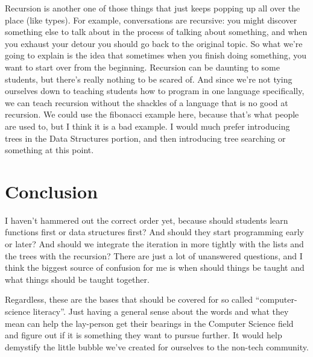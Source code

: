 \documentclass[12pt]{article}
\begin{document}
        Recursion is another one of those things that just keeps popping up all over the place (like types). For example, conversations are recursive: you might discover something else to talk about in the process of talking about something, and when you exhaust your detour you should go back to the original topic. So what we're going to explain is the idea that sometimes when you finish doing something, you want to start over from the beginning. Recursion can be daunting to some students, but there's really nothing to be scared of. And since we're not tying ourselves down to teaching students how to program in one language specifically, we can teach recursion without the shackles of a language that is no good at recursion. We could use the fibonacci example here, because that's what people are used to, but I think it is a bad example. I would much prefer introducing trees in the Data Structures portion, and then introducing tree searching or something at this point.  

    \section{Conclusion}

      I haven't hammered out the correct order yet, because should students learn functions first or data structures first? And should they start programming early or later? And should we integrate the iteration in more tightly with the lists and the trees with the recursion? There are just a lot of unanswered questions, and I think the biggest source of confusion for me is when should things be taught and what things should be taught together. 

      Regardless, these are the bases that should be covered for so called ``computer-science literacy''. Just having a general sense about the words and what they mean can help the lay-person get their bearings in the Computer Science field and figure out if it is something they want to pursue further. It would help demystify the little bubble we've created for ourselves to the non-tech community. 
      
\end{document}
